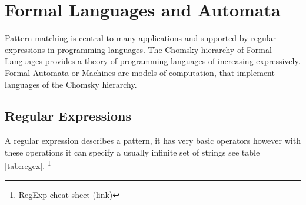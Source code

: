 \section{Formal Languages and Automata}
Pattern matching is central to many applications and supported by regular expressions in programming languages. The Chomsky hierarchy of Formal Languages provides a theory of programming languages of increasing expressively. Formal Automata or Machines are models of computation, that implement languages of the Chomsky hierarchy.
\subsection{Regular Expressions}
A regular expression describes a pattern, it has very basic operators however with these operations it can specify a usually infinite set of strings see table \ref{tab:regex}. \footnote{RegExp cheat sheet \href{https://www.cheatography.com/davechild/cheat-sheets/regular-expressions/}{(link)}}

